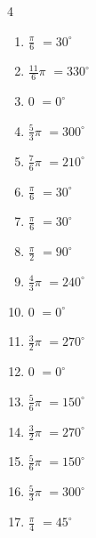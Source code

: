 \begin{multicols}{4}
\begin{enumerate}
  \item $\displaystyle \frac{\pi}{6}$
        $\displaystyle =30^{\circ}$

  \item $\displaystyle \frac{11}{6}\pi$
        $\displaystyle =330^{\circ}$

  \item $\displaystyle 0$
        $\displaystyle =0^{\circ}$

  \item $\displaystyle \frac{5}{3}\pi$
        $\displaystyle =300^{\circ}$

  \item $\displaystyle \frac{7}{6}\pi$
        $\displaystyle =210^{\circ}$

  \item $\displaystyle \frac{\pi}{6}$
        $\displaystyle =30^{\circ}$

  \item $\displaystyle \frac{\pi}{6}$
        $\displaystyle =30^{\circ}$

  \item $\displaystyle \frac{\pi}{2}$
        $\displaystyle =90^{\circ}$

  \item $\displaystyle \frac{4}{3}\pi$
        $\displaystyle =240^{\circ}$

  \item $\displaystyle 0$
        $\displaystyle =0^{\circ}$

  \item $\displaystyle \frac{3}{2}\pi$
        $\displaystyle =270^{\circ}$

  \item $\displaystyle 0$
        $\displaystyle =0^{\circ}$

  \item $\displaystyle \frac{5}{6}\pi$
        $\displaystyle =150^{\circ}$

  \item $\displaystyle \frac{3}{2}\pi$
        $\displaystyle =270^{\circ}$

  \item $\displaystyle \frac{5}{6}\pi$
        $\displaystyle =150^{\circ}$

  \item $\displaystyle \frac{5}{3}\pi$
        $\displaystyle =300^{\circ}$

  \item $\displaystyle \frac{\pi}{4}$
        $\displaystyle =45^{\circ}$


\end{enumerate}
\end{multicols}
